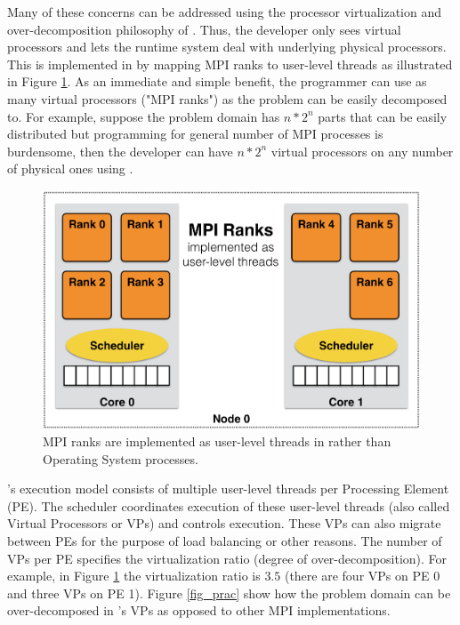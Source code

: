 \documentclass[10pt]{article}
\begin{document}
Many of these concerns can be addressed using the processor virtualization and 
over-decomposition philosophy of \charmpp{}. Thus, the developer only sees 
virtual processors and lets the runtime system deal with underlying physical 
processors. This is implemented in \ampi{} by mapping MPI ranks to \charmpp{}
user-level threads as illustrated in Figure \ref{fig_virt}. As an immediate and
simple benefit, the programmer can use as many virtual processors ("MPI ranks")
as the problem can be easily decomposed to. For example, suppose the problem
domain has $n*2^n$ parts that can be easily distributed but programming for
general number of MPI processes is burdensome, then the developer can have
$n*2^n$ virtual processors on any number of physical ones using \ampi{}.
  
\begin{figure}[h]
\centering
\includegraphics[width=4.6in]{figs/virtualization.png}
\caption{MPI ranks are implemented as user-level threads in \ampi{} rather than Operating System processes.}
\label{fig_virt}
\end{figure}

\ampi{}'s execution model consists of multiple user-level threads per Processing Element (PE).
The \charmpp{} scheduler coordinates
execution of these user-level threads (also called Virtual Processors or VPs) and controls
execution. These VPs can also migrate between
PEs for the purpose of load balancing or other reasons. The number of VPs
per PE specifies the virtualization ratio (degree of over-decomposition).
For example, in Figure \ref{fig_virt} the virtualization ratio is $3.5$ (there are
four VPs on PE 0 and three VPs on PE 1). Figure \ref{fig_prac} show how the problem domain
can be over-decomposed in \ampi{}'s VPs as opposed to other MPI implementations.
\end{document}
